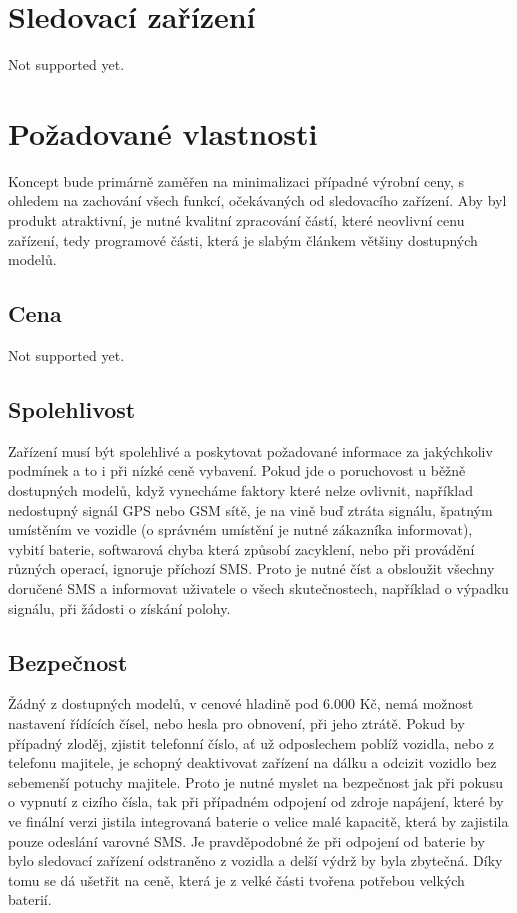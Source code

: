 \documentclass[FM,BP]{tulthesis}
\begin{document}
\section{Sledovací zařízení}
Not supported yet.

\section{Požadované vlastnosti}
Koncept bude primárně zaměřen na minimalizaci případné výrobní ceny, s ohledem na zachování všech funkcí, očekávaných od sledovacího zařízení. Aby byl produkt atraktivní, je nutné kvalitní zpracování částí, které neovlivní cenu zařízení, tedy programové části, která je slabým článkem většiny dostupných modelů.

\subsection{Cena}
Not supported yet.

\subsection{Spolehlivost}
Zařízení musí být spolehlivé a poskytovat požadované informace za jakýchkoliv podmínek a to i při nízké ceně vybavení. Pokud jde o poruchovost u běžně dostupných modelů, když vynecháme faktory které nelze ovlivnit, například nedostupný signál GPS nebo GSM sítě, je na vině buď ztráta signálu, špatným umístěním ve vozidle (o správném umístění je nutné zákazníka informovat), vybití baterie, softwarová chyba která způsobí zacyklení, nebo při provádění různých operací, ignoruje příchozí SMS. Proto je nutné číst a obsloužit všechny doručené SMS a informovat uživatele o všech skutečnostech, například o výpadku signálu, při žádosti o získání polohy.

\subsection{Bezpečnost}
Žádný z dostupných modelů, v cenové hladině pod 6.000 Kč, nemá možnost nastavení řídících čísel, nebo hesla pro obnovení, při jeho ztrátě. Pokud by případný zloděj, zjistit telefonní číslo, ať už odposlechem poblíž vozidla, nebo z telefonu majitele, je schopný deaktivovat zařízení na dálku a odcizit vozidlo bez sebemenší potuchy majitele. Proto je nutné myslet na bezpečnost jak při pokusu o vypnutí z cizího čísla, tak při případném odpojení od zdroje napájení, které by ve finální verzi jistila integrovaná baterie o velice malé kapacitě, která by zajistila pouze odeslání varovné SMS. Je pravděpodobné že při odpojení od baterie by bylo sledovací zařízení odstraněno z vozidla a delší výdrž by byla zbytečná. Díky tomu se dá ušetřit na ceně, která je z velké části tvořena potřebou velkých baterií.
\end{document}
